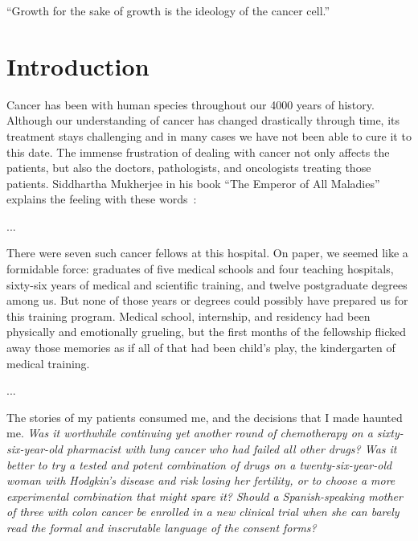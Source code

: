 
\begin{savequote}[.5\linewidth]
  ``Growth for the sake of growth is the ideology of the cancer cell.''
\end{savequote}
\chapter{Introduction}
\label{ch:intro}
Cancer has been with human species throughout our 4000 years of history.
Although our understanding of cancer has changed drastically through time, its
treatment stays challenging and in many cases we have not been able to cure it
to this date. The immense frustration of dealing with cancer not only affects
the patients, but also the doctors, pathologists, and oncologists treating those
patients. Siddhartha Mukherjee in his book ``The Emperor of All Maladies''
explains the feeling with these
words~\cite[prologue]{the-emperor-of-all-maladies}:

\begin{displayquote}
  ...
  
  There were seven such cancer fellows at this hospital. On paper, we seemed
  like a formidable force: graduates of five medical schools and four teaching
  hospitals, sixty-six years of medical and scientific training, and twelve
  postgraduate degrees among us. But none of those years or degrees could
  possibly have prepared us for this training program. Medical school,
  internship, and residency had been physically and emotionally grueling, but
  the first months of the fellowship flicked away those memories as if all of
  that had been child's play, the kindergarten of medical training.

  ...

  The stories of my patients consumed me, and the decisions that I made haunted
  me. \emph{Was it worthwhile continuing yet another round of chemotherapy on a
    sixty-six-year-old pharmacist with lung cancer who had failed all other
    drugs? Was it better to try a tested and potent combination of drugs on a
    twenty-six-year-old woman with Hodgkin's disease and risk losing her
    fertility, or to choose a more experimental combination that might spare it?
    Should a Spanish-speaking mother of three with colon cancer be enrolled in a
    new clinical trial when she can barely read the formal and inscrutable
    language of the consent forms?}
\end{displayquote}

